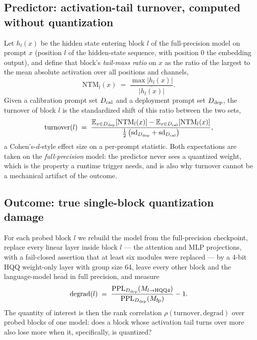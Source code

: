\documentclass{article}
\begin{document}
\subsection{Predictor: activation-tail turnover, computed without quantization}
\label{sec:method-signal}
Let $h_l(x)$ be the hidden state entering block $l$ of the full-precision model on prompt $x$
(position $l$ of the hidden-state sequence, with position $0$ the embedding output), and define
that block's \emph{tail-mass ratio} on $x$ as the ratio of the largest to the mean absolute
activation over all positions and channels,
\begin{equation}
\mathrm{NTM}_l(x) \;=\; \frac{\max |h_l(x)|}{\overline{|h_l(x)|}} .
\end{equation}
Given a calibration prompt set $D_{\rm cal}$ and a deployment prompt set $D_{\rm dep}$, the
turnover of block $l$ is the standardized shift of this ratio between the two sets,
\begin{equation}
\mathrm{turnover}(l) \;=\;
\frac{\mathbb{E}_{x\in D_{\rm dep}}\!\left[\mathrm{NTM}_l(x)\right]
      - \mathbb{E}_{x\in D_{\rm cal}}\!\left[\mathrm{NTM}_l(x)\right]}
     {\tfrac{1}{2}\left(\mathrm{sd}_{D_{\rm dep}} + \mathrm{sd}_{D_{\rm cal}}\right)} ,
\label{eq:turnover}
\end{equation}
a Cohen's-$d$-style effect size on a per-prompt statistic. Both expectations are taken on the
\emph{full-precision} model: the predictor never sees a quantized weight, which is the property a
runtime trigger needs, and is also why turnover cannot be a mechanical artifact of the outcome.

\subsection{Outcome: true single-block quantization damage}
\label{sec:method-outcome}
For each probed block $l$ we rebuild the model from the full-precision checkpoint, replace every
linear layer inside block $l$ --- the attention and MLP projections, with a fail-closed assertion
that at least six modules were replaced --- by a 4-bit HQQ weight-only layer with group size 64,
leave every other block and the language-model head in full precision, and measure
\begin{equation}
\mathrm{degrad}(l) \;=\;
\frac{\mathrm{PPL}_{D_{\rm dep}}\!\left(M_{l\to\rm HQQ4}\right)}
     {\mathrm{PPL}_{D_{\rm dep}}\!\left(M_{\rm fp}\right)} - 1 .
\label{eq:degrad}
\end{equation}
The quantity of interest is then the rank correlation
$\rho(\mathrm{turnover},\mathrm{degrad})$ over probed blocks of one model: does a block whose
activation tail turns over more also lose more when it, specifically, is quantized?
\end{document}
